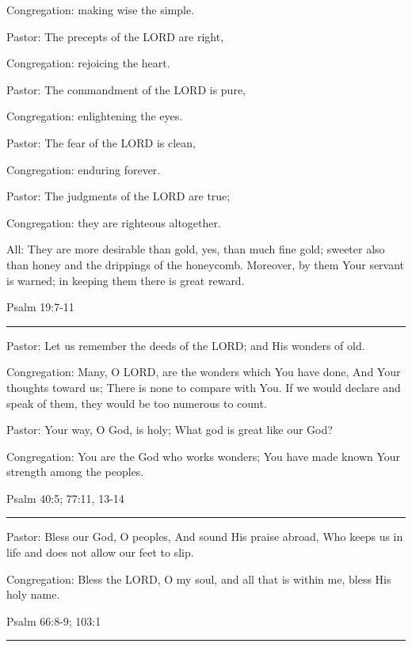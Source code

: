 \documentclass[]{book}
\begin{document}
Congregation: making wise the simple.

Pastor: The precepts of the LORD are right,

Congregation: rejoicing the heart.

Pastor: The commandment of the LORD is pure,

Congregation: enlightening the eyes.

Pastor: The fear of the LORD is clean,

Congregation: enduring forever.

Pastor: The judgments of the LORD are true;

Congregation: they are righteous altogether.

All: They are more desirable than gold, yes, than much fine gold;
sweeter also than honey and the drippings of the honeycomb. Moreover, by
them Your servant is warned; in keeping them there is great reward.

Psalm 19:7-11 \textbar{}

\begin{center}\rule{0.5\linewidth}{\linethickness}\end{center}

Pastor: Let us remember the deeds of the LORD; and His wonders of old.

Congregation: Many, O LORD, are the wonders which You have done, And
Your thoughts toward us; There is none to compare with You. If we would
declare and speak of them, they would be too numerous to count.

Pastor: Your way, O God, is holy; What god is great like our God?

Congregation: You are the God who works wonders; You have made known
Your strength among the peoples.

Psalm 40:5; 77:11, 13-14 \textbar{}

\begin{center}\rule{0.5\linewidth}{\linethickness}\end{center}

Pastor: Bless our God, O peoples, And sound His praise abroad, Who keeps
us in life and does not allow our feet to slip.

Congregation: Bless the LORD, O my soul, and all that is within me,
bless His holy name.

Psalm 66:8-9; 103:1 \textbar{}

\begin{center}\rule{0.5\linewidth}{\linethickness}\end{center}
\end{document}
